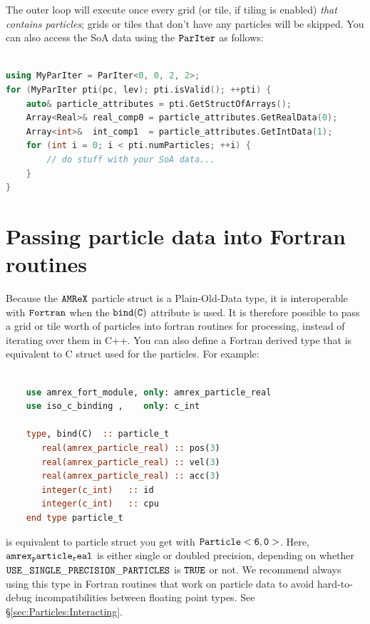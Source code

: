 The outer loop will execute once every grid (or tile, if tiling is enabled) \emph{that contains particles}; grids or tiles
that don't have any particles will be skipped. You can also access the SoA data using the $\tt{ParIter}$ as follows:

\begin{lstlisting}[language=cpp]

using MyParIter = ParIter<0, 0, 2, 2>;
for (MyParIter pti(pc, lev); pti.isValid(); ++pti) {
    auto& particle_attributes = pti.GetStructOfArrays();
    Array<Real>& real_comp0 = particle_attributes.GetRealData(0);
    Array<int>&  int_comp1  = particle_attributes.GetIntData(1);
    for (int i = 0; i < pti.numParticles; ++i) {
        // do stuff with your SoA data...
    }
}
\end{lstlisting}

\section{Passing particle data into Fortran routines}
\label{sec:Particles:Fortran}

Because the $\tt{AMReX}$ particle struct is a Plain-Old-Data type, it is interoperable with $\tt{Fortran}$ when the $\tt{bind(C)}$
attribute is used. It is therefore possible to pass a grid or tile worth of particles into fortran routines for processing,
instead of iterating over them in C++. You can also define a Fortran derived type that is equivalent to C struct used for the
particles. For example:

\begin{lstlisting}[language=fortran]

    use amrex_fort_module, only: amrex_particle_real
    use iso_c_binding ,    only: c_int

    type, bind(C)  :: particle_t
       real(amrex_particle_real) :: pos(3)
       real(amrex_particle_real) :: vel(3)
       real(amrex_particle_real) :: acc(3)
       integer(c_int)   :: id
       integer(c_int)   :: cpu
    end type particle_t

\end{lstlisting}

is equivalent to particle struct you get with $\tt{Particle<6, 0>}$. Here, $\tt{amrex_particle_real}$ is either single or doubled precision, depending 
on whether $\tt{USE\_SINGLE\_PRECISION\_PARTICLES}$ is $\tt{TRUE}$ or not. We recommend always using this type in Fortran routines that work on particle
data to avoid hard-to-debug incompatibilities between floating point types.
See \S \ref{sec:Particles:Interacting}.
